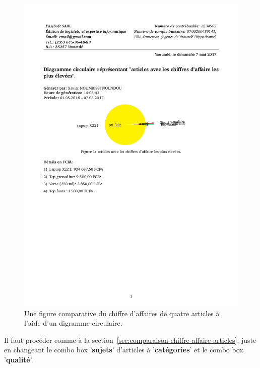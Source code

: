 \begin{figure}[!htbp]
	\centering
	\includegraphics[scale=0.65]{images/diagramme-circulaire-chiffre-daffaire-comparatif-articles.png}
	\caption{Une figure comparative du chiffre d'affaires de
		quatre articles \`a l'aide d'un digramme circulaire.}
	\label{fig:diagramme-circulaire-chiffre-daffaire-comparatif-articles}
\end{figure}


\newpage
{}

Il faut proc\'eder comme \`a la section~\ref{sec:comparaison-chiffre-affaire-articles}, juste
en changeant le combo box '\textbf{sujets}' d'articles \`a
'\textbf{cat\'egories}' et le combo box '\textbf{qualit\'e}'.

